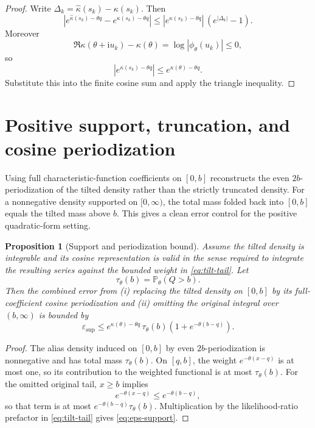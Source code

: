 \documentclass[11pt]{article}
\newtheorem{proposition}[theorem]{Proposition}
\theoremstyle{definition}
\newcommand{\Pp}{\mathbb P}
\newcommand{\eps}{\varepsilon}
\newcommand{\ii}{\mathrm{i}}
\begin{document}
\begin{proof}
Write $\Delta_k=\widehat\kappa(s_k)-\kappa(s_k)$. Then
\[
|e^{\widehat\kappa(s_k)-\theta q}-e^{\kappa(s_k)-\theta q}|
\le
|e^{\kappa(s_k)-\theta q}|\,(e^{|\Delta_k|}-1).
\]
Moreover
\[
\Re\kappa(\theta+\ii u_k)-\kappa(\theta)
=\log|\phi_{\theta}(u_k)|\le0,
\]
so
\[
|e^{\kappa(s_k)-\theta q}|
\le e^{\kappa(\theta)-\theta q}.
\]
Substitute this into the finite cosine sum and apply the triangle inequality.
\end{proof}

\section{Positive support, truncation, and cosine periodization}

Using full characteristic-function coefficients on $[0,b]$ reconstructs the even $2b$-periodization of the tilted density rather than the strictly truncated density. For a nonnegative density supported on $[0,\infty)$, the total mass folded back into $[0,b]$ equals the tilted mass above $b$. This gives a clean error control for the positive quadratic-form setting.

\begin{proposition}[Support and periodization bound]
\label{prop:support}
Assume the tilted density is integrable and its cosine representation is valid in the sense required to integrate the resulting series against the bounded weight in \eqref{eq:tilt-tail}. Let
\[
\tau_{\theta}(b)=\Pp_{\theta}(Q>b).
\]
Then the combined error from (i) replacing the tilted density on $[0,b]$ by its full-coefficient cosine periodization and (ii) omitting the original integral over $(b,\infty)$ is bounded by
\begin{equation}
\eps_{\mathrm{sup}}
\le
e^{\kappa(\theta)-\theta q}\,
\tau_{\theta}(b)
\left(1+e^{-\theta(b-q)}\right).
\label{eq:eps-support}
\end{equation}
\end{proposition}

\begin{proof}
The alias density induced on $[0,b]$ by even $2b$-periodization is nonnegative and has total mass $\tau_{\theta}(b)$. On $[q,b]$, the weight $e^{-\theta(x-q)}$ is at most one, so its contribution to the weighted functional is at most $\tau_{\theta}(b)$. For the omitted original tail, $x\ge b$ implies
\[
e^{-\theta(x-q)}\le e^{-\theta(b-q)},
\]
so that term is at most $e^{-\theta(b-q)}\tau_{\theta}(b)$. Multiplication by the likelihood-ratio prefactor in \eqref{eq:tilt-tail} gives \eqref{eq:eps-support}.
\end{proof}
\end{document}
